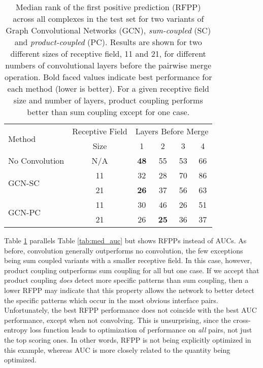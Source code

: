 \begin{table}
	\begin{center}
		\begin{tabular}{lccccc}
			\toprule
			\multirow{2}{*}{Method} &
			Receptive Field & \multicolumn{4}{c}{Layers Before Merge} \\
			& Size & 1 & {2} & {3} & {4} \\
			\midrule
			No Convolution & N/A & \textbf{48} & 55 & 53 & 66 \\\cline{1-6}
			\multirow{2}{*}{GCN-SC} & 11 & 32 & 28 & 70 & 86 \\
			& 21 & \textbf{26} & 37 & 56 & 63 \\\cline{1-6}
			\multirow{2}{*}{GCN-PC} & 11 & 30 & 46 & 26 & 51 \\
			& 21 & 26 & \textbf{25} & 36 & 37 \\
			\bottomrule
		\end{tabular}
		\caption{Median rank of the first positive prediction (RFPP) across all complexes in the test set for two variants of Graph Convolutional Networks (GCN), \textit{sum-coupled} (SC) and \textit{product-coupled} (PC). Results are shown for two different sizes of receptive field, 11 and 21, for different numbers of convolutional layers before the pairwise merge operation. Bold faced values indicate best performance for each method (lower is better). For a given receptive field size and number of layers, product coupling performs better than sum coupling except for one case.}
		\label{tab:med_rfpp}
	\end{center}
\end{table}

Table \ref{tab:med_rfpp} parallels Table \ref{tab:med_auc} but shows RFPPs instead of AUCs.
As before, convolution generally outperforms no convolution, the few exceptions being sum coupled variants with a smaller receptive field.
In this case, however, product coupling outperforms sum coupling for all but one case.
If we accept that product coupling \emph{does} detect more specific patterns than sum coupling, then a lower RFPP may indicate that this property allows the network to better detect the specific patterns which occur in the most  obvious interface pairs.
Unfortunately, the best RFPP performance does not coincide with the best AUC performance, except when not convolving.
This is unsurprising, since the cross-entropy loss function leads to optimization of performance on \emph{all} pairs, not just the top scoring ones.
In other words, RFPP is not being explicitly optimized in this example, whereas AUC is more closely related to the quantity being optimized.

